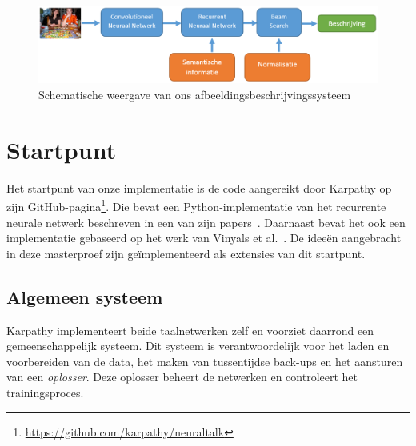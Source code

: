 \begin{figure}
\centering
\includegraphics[width=\linewidth]{Images/system_overview}
\caption{Schematische weergave van ons afbeeldingsbeschrijvingssysteem}
\label{fig:system_overview}
\end{figure}



\section{Startpunt}
Het startpunt van onze implementatie is de code aangereikt door Karpathy op zijn GitHub-pagina\footnote{\url{https://github.com/karpathy/neuraltalk}}. Die bevat een Python-implementatie van het recurrente neurale netwerk beschreven in een van zijn papers~\cite{Karpathy2015}. Daarnaast bevat het ook een implementatie gebaseerd op het werk van Vinyals et al.~\cite{Google}. De idee\"en aangebracht in deze masterproef zijn ge\"implementeerd als extensies van dit startpunt.

\subsection{Algemeen systeem}
Karpathy implementeert beide taalnetwerken zelf en voorziet daarrond een gemeenschappelijk systeem. Dit systeem is verantwoordelijk voor het laden en voorbereiden van de data, het maken van tussentijdse back-ups en het aansturen van een \emph{oplosser}. Deze oplosser beheert de netwerken en controleert het trainingsproces.

